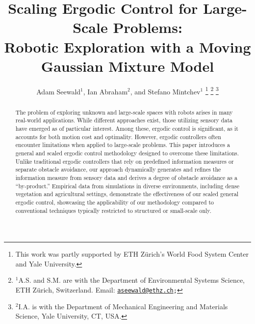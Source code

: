 \documentclass[letterpaper,10pt,conference,twoside]{IEEEtran}
\theoremstyle{definition}
\begin{document}

\title{\LARGE\bf Scaling Ergodic Control for Large-Scale Problems:\\Robotic Exploration with a Moving Gaussian Mixture Model}

\author{Adam Seewald${}^{\text{1}}$, Ian Abraham${}^{\text{2}}$, and Stefano Mintchev${}^{\text{1}}$
  \thanks{This work was partly supported by ETH Z{\"u}rich's World Food System Center and Yale University.}
  \thanks{${}^{\text{1}}$A.\hspace*{.4ex}S. and S.\hspace*{.4ex}M. are with the Department of Environmental Systems Science, ETH Z{\"u}rich, Switzerland. Email: {\tt\footnotesize \href{mailto:aseewald@ethz.ch}{aseewald@ethz.ch};}}
  \thanks{${}^{\text{2}}$I.\hspace*{.4ex}A. is with the Department of Mechanical Engineering and Materials Science, Yale University, CT, USA.}
}

\maketitle

\vspace*{-.5cm}
\begin{abstract}
  The problem of exploring unknown and large-scale spaces with robots arises in many real-world applications. While different approaches exist, those utilizing sensory data have emerged as of particular interest. Among these, ergodic control is significant, as it accounts for both motion cost and optimality. However, ergodic controllers often encounter limitations when applied to large-scale problems. This paper introduces a general and scaled ergodic control methodology designed to overcome these limitations. Unlike traditional ergodic controllers that rely on predefined information measures or separate obstacle avoidance, our approach dynamically generates and refines the information measure from sensory data and derives a degree of obstacle avoidance as a ``by-product.'' Empirical data from simulations in diverse environments, including dense vegetation and agricultural settings, demonstrate the effectiveness of our scaled general ergodic control, showcasing the applicability of our methodology compared to conventional techniques typically restricted to structured or small-scale only.
\end{abstract}



\end{document}
